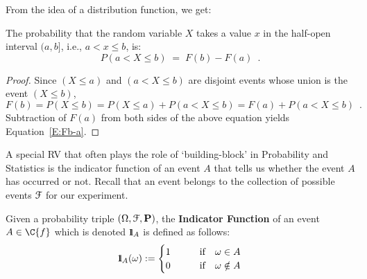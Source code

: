 From the idea of a distribution function, we get:

\begin{framed}
\begin{prop}
The probability that the random variable $X$ takes a value $x$ in the half-open interval $(a,b]$, i.e., $a < x \leq b$, is:
\begin{equation}\label{E:Fb-a}
P(a < X \leq b)\; = \;F(b) - F(a)\enspace .
\end{equation}
\end{prop}
\end{framed}

{\scriptsize
\begin{proof}
Since  $(X \leq a)$ and $(a < X \leq b)$ are disjoint events whose union is the event $(X \leq b)$,
\[
F(b)  = P(X \leq b) = P(X \leq a) + P(a < X \leq b) = F(a) + P (a < X \leq b) \enspace .
\]
Subtraction of $F(a)$ from both sides of the above equation yields
Equation~\ref{E:Fb-a}.
\end{proof}
}


A special RV that often plays the role of `building-block' in Probability and Statistics is the indicator function of an event $A$ that tells us whether the event $A$ has occurred or not.  Recall that an event belongs to the collection of possible events $\mathcal{F}$ for our experiment.
\begin{definition}
Given a probability triple $(\Omega,\mathcal{F},\mathbf{P})$, the {\bf Indicator Function} of an event $A \in \C{f}$ which is denoted ${1}\mspace{-11 mu}{1}_A$ is defined as follows:
\begin{equation}
{1}\mspace{-11 mu}{1}_A(\omega) := 
\begin{cases}
1 & \qquad \text{if} \quad \omega \in A \\
0 & \qquad \text{if} \quad \omega \notin A
\end{cases}
\end{equation}
\end{definition}



